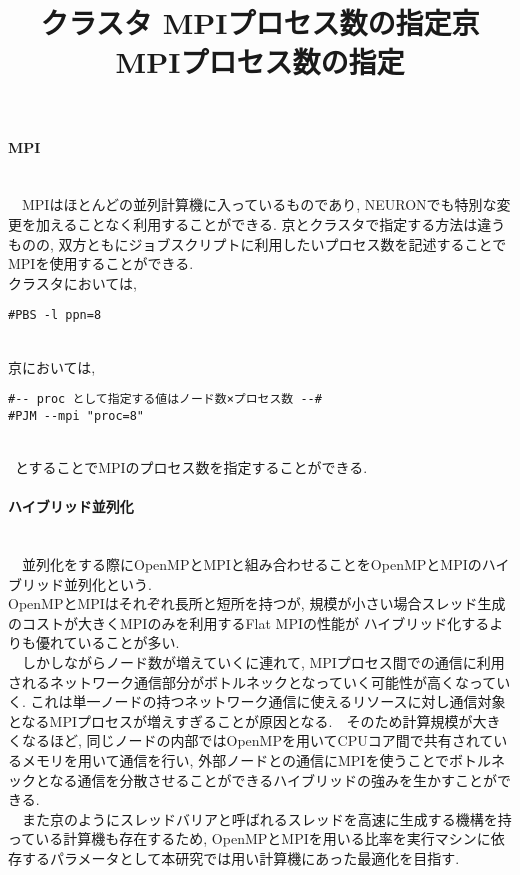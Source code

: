 \paragraph{MPI}~\\
　MPIはほとんどの並列計算機に入っているものであり, NEURONでも特別な変更を加えることなく利用することができる.
京とクラスタで指定する方法は違うものの, 双方ともにジョブスクリプトに利用したいプロセス数を記述することでMPIを使用することができる.\\
クラスタにおいては,
\begin{table}[htb]
\begin{center}
  \title {クラスタ MPIプロセス数の指定}
{\footnotesize
\begin{framed}
\begin{verbatim}
#PBS -l ppn=8
\end{verbatim}
\end{framed}
}
\end{center}
\end{table}~\\
京においては,\\
\begin{table}[htb]
  \begin{center}
  \title {京 MPIプロセス数の指定}
{\footnotesize
\begin{framed}
\begin{verbatim}
#-- proc として指定する値はノード数×プロセス数 --#
#PJM --mpi "proc=8"
\end{verbatim}
\end{framed}
}
\end{center}
\end{table}~\\
\
とすることでMPIのプロセス数を指定することができる.\\

\paragraph{ハイブリッド並列化}~\\
　並列化をする際にOpenMPとMPIと組み合わせることをOpenMPとMPIのハイブリッド並列化という.\\
OpenMPとMPIはそれぞれ長所と短所を持つが, 規模が小さい場合スレッド生成のコストが大きくMPIのみを利用するFlat MPIの性能が
ハイブリッド化するよりも優れていることが多い.\\
　しかしながらノード数が増えていくに連れて, MPIプロセス間での通信に利用されるネットワーク通信部分がボトルネックとなっていく可能性が高くなっていく.
これは単一ノードの持つネットワーク通信に使えるリソースに対し通信対象となるMPIプロセスが増えすぎることが原因となる.　そのため計算規模が大きくなるほど, 同じノードの内部ではOpenMPを用いてCPUコア間で共有されているメモリを用いて通信を行い,
外部ノードとの通信にMPIを使うことでボトルネックとなる通信を分散させることができるハイブリッドの強みを生かすことができる.\\
　また京のようにスレッドバリアと呼ばれるスレッドを高速に生成する機構を持っている計算機も存在するため,
OpenMPとMPIを用いる比率を実行マシンに依存するパラメータとして本研究では用い計算機にあった最適化を目指す.\\
